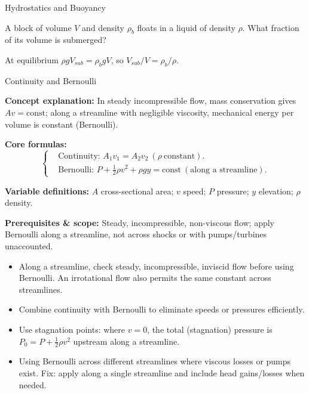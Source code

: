 \begin{KnowledgePoint}{Hydrostatics and Buoyancy \Core}
  \KPProblems
\begin{cheatproblem}
  A block of volume $V$ and density $\rho_b$ floats in a liquid of density $\rho$. What fraction of its volume is submerged?
  \begin{solutionbox}
  At equilibrium $\rho g V_{sub}=\rho_b g V$, so $V_{sub}/V=\rho_b/\rho$.
  \end{solutionbox}
  \end{cheatproblem}
\end{KnowledgePoint}

\begin{KnowledgePoint}{Continuity and Bernoulli \Core}
  \KPFormulas
  \begin{formulabox}
  \textbf{Concept explanation:} In steady incompressible flow, mass conservation gives $Av=\text{const}$; along a streamline with negligible viscosity, mechanical energy per volume is constant (Bernoulli).

  \textbf{Core formulas:}
  \[
  \left\{\begin{aligned}
    &\text{Continuity: } A_1 v_1=A_2 v_2\ (\rho \ \text{constant}).\\
    &\text{Bernoulli: } P+\tfrac12\rho v^2+\rho g y=\text{const}\ (\text{along a streamline}).
  \end{aligned}\right.
  \]

  \textbf{Variable definitions:} $A$ cross-sectional area; $v$ speed; $P$ pressure; $y$ elevation; $\rho$ density.

  

  \textbf{Prerequisites \& scope:} Steady, incompressible, non-viscous flow; apply Bernoulli along a streamline, not across shocks or with pumps/turbines unaccounted.
  \end{formulabox}

  \KPHeuristics
  \begin{heuristicsbox}
  \begin{itemize}[leftmargin=*]
    \item Along a streamline, check steady, incompressible, inviscid flow before using Bernoulli. An irrotational flow also permits the same constant across streamlines.
    \item Combine continuity with Bernoulli to eliminate speeds or pressures efficiently.
  \item Use stagnation points: where $v=0$, the total (stagnation) pressure is $P_0=P+\tfrac12\rho v^2$ upstream along a streamline.
  \end{itemize}
  \vspace{0.4em}
  \begin{itemize}[leftmargin=*]
    \item Using Bernoulli across different streamlines where viscous losses or pumps exist. Fix: apply along a single streamline and include head gains/losses when needed.
  \end{itemize}
  \end{heuristicsbox}


\end{KnowledgePoint}
